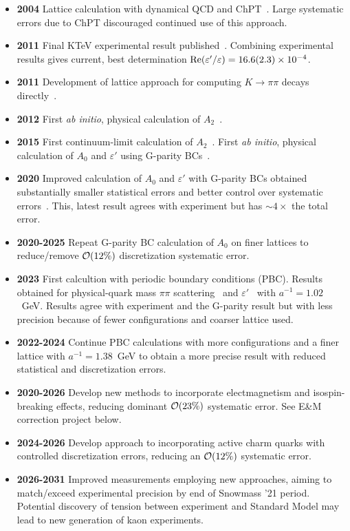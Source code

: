 \documentclass[12pt,hyperpdf]{article}
\begin{document}
\begin{itemize}
\begin{itemize}
    \item{\bf 2004} Lattice calculation with dynamical QCD and ChPT~\cite{Li:2008kc}. Large systematic errors due to ChPT discouraged continued use of this approach.
    \item{\bf 2011} Final KTeV experimental result published~\cite{KTeV:2010sng}. Combining experimental results gives current, best determination ${\rm Re}(\varepsilon'/\varepsilon)=16.6(2.3)\times 10^{-4}$.
    \item{\bf 2011} Development of lattice approach for computing $K\to\pi\pi$ decays directly~\cite{Blum:2011pu}.
    \item{\bf 2012} First {\it ab initio}, physical calculation of $A_2$~\cite{Blum:2011ng,Blum:2012uk}.
    \item{\bf 2015} First continuum-limit calculation of $A_2$~\cite{Blum:2015ywa}. First {\it ab initio}, physical calculation of $A_0$ and $\varepsilon'$ using G-parity BCs~\cite{RBC:2015gro}.
    \item{\bf 2020} Improved calculation of $A_0$ and $\varepsilon'$ with G-parity BCs obtained substantially smaller statistical errors 
     and better control over systematic errors~\cite{RBC:2020kdj}. This, latest result agrees with experiment but has ${\sim}4\times$ 
     the total error.
    \item{\bf 2020-2025} Repeat G-parity BC calculation of $A_0$ on finer lattices to reduce/remove ${\cal O}(12\%)$ discretization 
    systematic error.
    \item{\bf 2023} First calcultion with periodic boundary conditions (PBC).  Results obtained for physical-quark mass 
    $\pi\pi$ scattering~\cite{RBC:2023xqv} and $\varepsilon'$~\cite{RBC:2023ynh} with $a^{-1}=1.02$~GeV.  Results agree with 
    experiment and the G-parity result but with less precision because of fewer configurations and coarser lattice used.
    \item{\bf 2022-2024} Continue PBC calculations with more configurations and a finer lattice with $a^{-1}=1.38$~GeV to obtain 
    a more precise result with reduced statistical and discretization errors.
    \item{\bf 2020-2026} Develop new methods to incorporate electmagnetism and isospin-breaking effects, reducing dominant 
    ${\cal O}(23\%)$ systematic error.  See E\&M correction project below.
    \item{\bf 2024-2026} Develop approach to incorporating active charm quarks with controlled discretization errors, reducing 
    an ${\cal O}(12\%)$ systematic error.
    \item{\bf 2026-2031} Improved measurements employing new approaches, aiming to match/exceed experimental precision 
    by end of Snowmass '21 period. Potential discovery of tension between experiment and Standard Model may lead to new 
    generation of kaon experiments.
\end{itemize}
\end{itemize}
\end{document}
